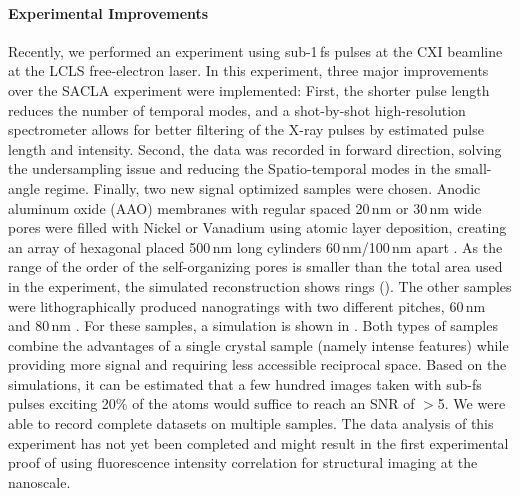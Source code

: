 \paragraph{Experimental Improvements}
Recently, we performed an experiment using sub-1\,fs pulses at the CXI beamline at the LCLS free-electron laser. In this experiment, three major improvements over the SACLA experiment were implemented: First, the shorter pulse length reduces the number of temporal modes, and a shot-by-shot high-resolution spectrometer allows for better filtering of the X-ray pulses by estimated pulse length and intensity. Second, the data was recorded in forward direction, solving the undersampling issue and reducing the Spatio-temporal modes in the small-angle regime. Finally, two new signal optimized samples were chosen. Anodic aluminum oxide (AAO) membranes with regular spaced 20\,nm or 30\,nm wide pores were filled with Nickel or Vanadium using atomic layer deposition, creating an array of hexagonal placed 500\,nm long cylinders 60\,nm/100\,nm apart \cite{carina2019}. As the range of the order of the self-organizing pores is smaller than the total area used in the experiment, the simulated reconstruction shows rings ().  The other samples were lithographically produced nanogratings with two different pitches, 60\,nm  and 80\,nm \cite{mojarad2015}. For these samples, a simulation is shown in . Both types of samples combine the advantages of a single crystal sample (namely intense features) while providing more signal and requiring less accessible reciprocal space. 
Based on the simulations, it can be estimated that a few hundred images taken with sub-fs pulses exciting 20\% of the atoms would suffice to reach an SNR of $>$5.
We were able to record complete datasets on multiple samples. The data analysis of this experiment has not yet been completed and might result in the first experimental proof of using fluorescence intensity correlation for structural imaging at the nanoscale.  


